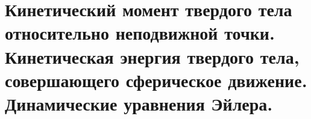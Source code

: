 \chapter{Кинетический момент твердого тела относительно неподвижной точки.
Кинетическая энергия твердого тела, совершающего сферическое движение.
Динамические уравнения Эйлера.}

\newpage
